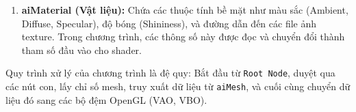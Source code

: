 \begin{enumerate}
	\item \textbf{aiMaterial (Vật liệu):}
	Chứa các thuộc tính bề mặt như màu sắc (Ambient, Diffuse, Specular), độ bóng (Shininess), và đường dẫn đến các file ảnh texture. Trong chương trình, các thông số này được đọc và chuyển đổi thành tham số đầu vào cho shader.
\end{enumerate}

Quy trình xử lý của chương trình là đệ quy: Bắt đầu từ \texttt{Root Node}, duyệt qua các nút con, lấy chỉ số mesh, truy xuất dữ liệu từ \texttt{aiMesh}, và cuối cùng chuyển dữ liệu đó sang các bộ đệm OpenGL (VAO, VBO).